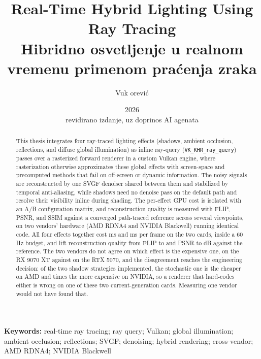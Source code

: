 \documentclass[master,a4paper,12pt,oneside]{etf}
\title{Real-Time Hybrid Lighting Using Ray Tracing\\[0.6ex]
       {\large Hibridno osvetljenje u realnom vremenu primenom pra\'cenja zraka}}
\author{Vuk \DJ or\dj evi\'c}
\date{2026\\[1.5ex]{\normalsize revidirano izdanje, uz doprinos AI agenata}}
\newenvironment{keywordsen}
  {\vspace{5ex}\parindent 0pt {\bfseries Keywords:}}
  {\par\vfil\null\endtitlepage}
\begin{document}
\maketitle

\begin{abstract}
This thesis integrates four ray-traced lighting effects (shadows, ambient occlusion, reflections,
and diffuse global illumination) as inline ray-query (\texttt{VK_KHR_ray_query}) passes over a
rasterized forward renderer in a custom Vulkan engine, where rasterization otherwise approximates
these global effects with screen-space and precomputed methods that fail on off-screen or dynamic
information. The noisy signals are reconstructed by one SVGF denoiser shared between them and
stabilized by temporal anti-aliasing, while shadows need no denoise pass on the default path and
resolve their visibility inline during shading. The per-effect GPU cost is isolated with an A/B configuration matrix, and
reconstruction quality is measured with FLIP, PSNR, and SSIM against a converged path-traced
reference across several viewpoints, on two vendors' hardware (AMD RDNA4 and NVIDIA Blackwell)
running identical code. All four effects together cost \perfTotalAMD{} ms and \perfTotalNV{} ms per
frame on the two cards, inside a 60 Hz budget, and lift reconstruction quality from FLIP
\qRasterFlip{} to \qAllRtFlip{} and PSNR \qRasterPsnr{} to \qAllRtPsnr{} dB against the reference.
The two vendors do not agree on which effect is the expensive one, \perfTopEffectAMD{} on the
RX 9070 XT against \perfTopEffectNV{} on the RTX 5070, and the disagreement reaches the engineering
decision: of the two shadow strategies implemented, the stochastic one is the cheaper on AMD and
\perfShadowRatioNV{} times the more expensive on NVIDIA, so a renderer that hard-codes either is
wrong on one of these two current-generation cards. Measuring one vendor would not have found that.
\end{abstract}

\begin{keywordsen}
real-time ray tracing; ray query; Vulkan; global illumination; ambient occlusion; reflections; SVGF;
denoising; hybrid rendering; cross-vendor; AMD RDNA4; NVIDIA Blackwell
\end{keywordsen}
\end{document}
